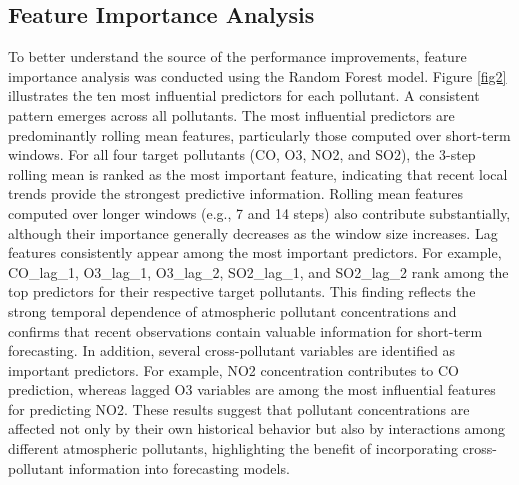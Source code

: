 \documentclass[twoside]{article}
\begin{document}
\subsection{Feature Importance Analysis} 
To better understand the source of the performance improvements, feature importance analysis was conducted using the Random Forest model. Figure \ref{fig2} illustrates the ten most influential predictors for each pollutant. A consistent pattern emerges across all pollutants. The most influential predictors are predominantly rolling mean features, particularly those computed over short-term windows. For all four target pollutants (CO, O3, NO2, and SO2), the 3-step rolling mean is ranked as the most important feature, indicating that recent local trends provide the strongest predictive information. Rolling mean features computed over longer windows (e.g., 7 and 14 steps) also contribute substantially, although their importance generally decreases as the window size increases. Lag features consistently appear among the most important predictors. For example, CO\_lag\_1, O3\_lag\_1, O3\_lag\_2, SO2\_lag\_1, and SO2\_lag\_2 rank among the top predictors for their respective target pollutants. This finding reflects the strong temporal dependence of atmospheric pollutant concentrations and confirms that recent observations contain valuable information for short-term forecasting. In addition, several cross-pollutant variables are identified as important predictors. For example, NO2 concentration contributes to CO prediction, whereas lagged O3
 variables are among the most influential features for predicting NO2. These results suggest that pollutant concentrations are affected not only by their own historical behavior but also by interactions among different atmospheric pollutants, highlighting the benefit of incorporating cross-pollutant information into forecasting models.


\end{document}
